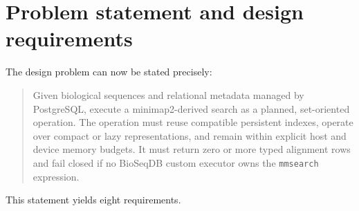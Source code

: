 \section{Problem statement and design requirements}
\label{sec:bioseq-problem-statement}

The design problem can now be stated precisely:

\begin{quote}
  Given biological sequences and relational metadata managed by PostgreSQL,
  execute a minimap2-derived search as a planned, set-oriented operation.  The
  operation must reuse compatible persistent indexes, operate over compact or
  lazy representations, and remain within explicit host and device memory
  budgets.  It must return zero or more typed alignment rows and fail closed if
  no BioSeqDB custom executor owns the \texttt{mmsearch} expression.
\end{quote}

This statement yields eight requirements.


